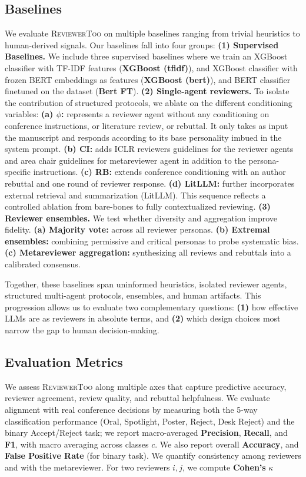 \documentclass{article} %
\newcommand{\shrink}[1][0.5]{\vspace{-#1\baselineskip}}
\begin{document}
\subsection{Baselines}
\label{sec:baselines}
We evaluate \textsc{ReviewerToo} on multiple baselines ranging from trivial heuristics to human-derived signals. Our baselines fall into four groups:
\textbf{(1) Supervised Baselines.}  
We include three supervised baselines where we train an XGBoost classifier with TF-IDF features (\textbf{XGBoost (tfidf)}), and XGBoost classifier with frozen BERT embeddings as features (\textbf{XGBoost (bert)}), and BERT classifier finetuned on the dataset (\textbf{Bert FT}).
\textbf{(2) Single-agent reviewers.}  
To isolate the contribution of structured protocols, we ablate on the different conditioning variables:
\textbf{(a) $\phi$:} represents a reviewer agent without any conditioning on conference instructions, or literature review, or rebuttal. It only takes as input the manuscript and responds according to its base personality imbued in the system prompt.
\textbf{(b) CI:} adds ICLR reviewers guidelines for the reviewer agents and area chair guidelines for metareviewer agent in addition to the persona-specific instructions. 
\textbf{(c) RB:} extends conference conditioning with an author rebuttal and one round of reviewer response.
\textbf{(d) LitLLM:} further incorporates external retrieval and summarization (LitLLM).
This sequence reflects a controlled ablation from bare-bones to fully contextualized reviewing.
\textbf{(3) Reviewer ensembles.}  
We test whether diversity and aggregation improve fidelity.
\textbf{(a) Majority vote:} across all reviewer personas.  
\textbf{(b) Extremal ensembles:} combining permissive and critical personas to probe systematic bias.  
\textbf{(c) Metareviewer aggregation:} synthesizing all reviews and rebuttals into a calibrated consensus.

Together, these baselines span uninformed heuristics, isolated reviewer agents, structured multi-agent protocols, ensembles, and human artifacts. This progression allows us to evaluate two complementary questions:  
\textbf{(1)} how effective LLMs are as reviewers in absolute terms, and  
\textbf{(2)} which design choices most narrow the gap to human decision-making.

\subsection{Evaluation Metrics} \shrink[.75] 
We assess \textsc{ReviewerToo} along multiple axes that capture predictive accuracy, reviewer agreement, review quality, and rebuttal helpfulness.
We evaluate alignment with real conference decisions by measuring both the 5-way classification performance (Oral, Spotlight, Poster, Reject, Desk Reject) and the binary Accept/Reject task; we report macro-averaged
\textbf{Precision}, \textbf{Recall}, and \textbf{F1},
with macro averaging across classes $c$. 
We also report overall \textbf{Accuracy}, and \textbf{False Positive Rate} (for binary task).
We quantify consistency among reviewers and with the metareviewer. 
For two reviewers $i,j$, we compute \textbf{Cohen’s} $\kappa$
\end{document}
